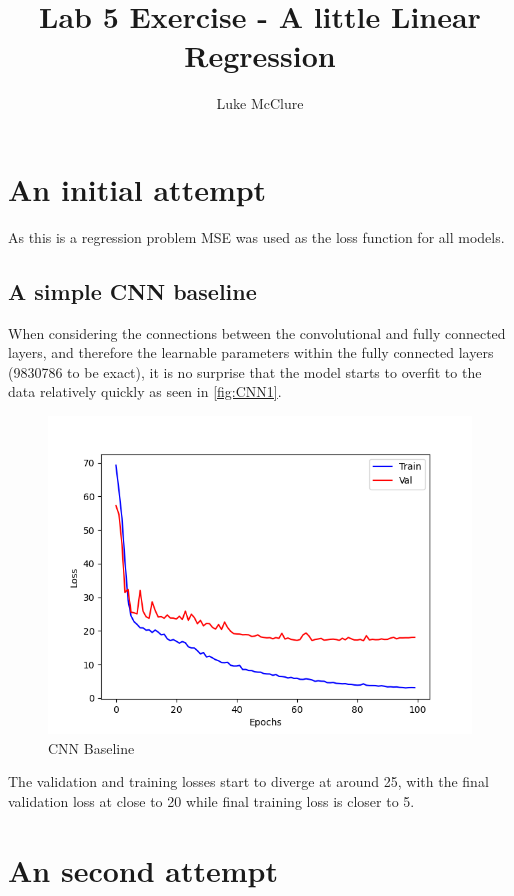 \documentclass[sigconf]{acmart}
\begin{document}
\title{Lab 5 Exercise -  A little Linear Regression}
\author{Luke McClure}

\maketitle
\pagestyle{myheadings}

\section{An initial attempt}
As this is a regression problem MSE was used as the loss function for all models.
\subsection{A simple CNN baseline}
When considering the connections between the convolutional and fully connected layers, and therefore the learnable parameters within the fully connected layers (9830786 to be exact), it is no surprise that the model starts to overfit to the data relatively quickly as seen in \autoref{fig:CNN1}.

\begin{figure}[h]
    \includegraphics[scale=0.35]{../CNN1.png}
    \caption{CNN Baseline}
    \label{fig:CNN1}
\end{figure}

The validation and training losses start to diverge at around 25, with the final validation loss at close to 20 while final training loss is closer to 5.

\section{An second attempt}
\end{document}
